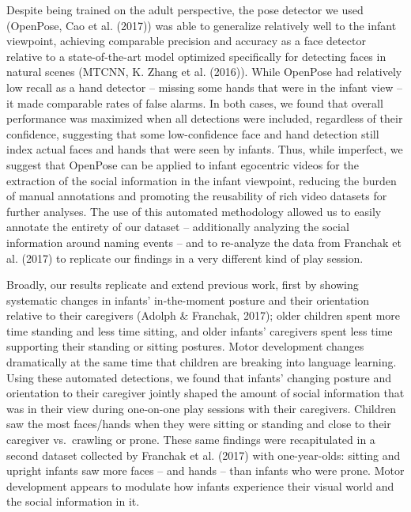 \documentclass[english,man]{apa6}
\begin{document}
Despite being trained on the adult perspective, the pose detector we
used (OpenPose, Cao et al. (2017)) was able to generalize relatively
well to the infant viewpoint, achieving comparable precision and
accuracy as a face detector relative to a state-of-the-art model
optimized specifically for detecting faces in natural scenes (MTCNN, K.
Zhang et al. (2016)). While OpenPose had relatively low recall as a hand
detector -- missing some hands that were in the infant view -- it made
comparable rates of false alarms. In both cases, we found that overall
performance was maximized when all detections were included, regardless
of their confidence, suggesting that some low-confidence face and hand
detection still index actual faces and hands that were seen by infants.
Thus, while imperfect, we suggest that OpenPose can be applied to infant
egocentric videos for the extraction of the social information in the
infant viewpoint, reducing the burden of manual annotations and
promoting the reusability of rich video datasets for further analyses.
The use of this automated methodology allowed us to easily annotate the
entirety of our dataset -- additionally analyzing the social information
around naming events -- and to re-analyze the data from Franchak et al.
(2017) to replicate our findings in a very different kind of play
session.

Broadly, our results replicate and extend previous work, first by
showing systematic changes in infants' in-the-moment posture and their
orientation relative to their caregivers (Adolph \& Franchak, 2017);
older children spent more time standing and less time sitting, and older
infants' caregivers spent less time supporting their standing or sitting
postures. Motor development changes dramatically at the same time that
children are breaking into language learning. Using these automated
detections, we found that infants' changing posture and orientation to
their caregiver jointly shaped the amount of social information that was
in their view during one-on-one play sessions with their caregivers.
Children saw the most faces/hands when they were sitting or standing and
close to their caregiver vs.~crawling or prone. These same findings were
recapitulated in a second dataset collected by Franchak et al. (2017)
with one-year-olds: sitting and upright infants saw more faces -- and
hands -- than infants who were prone. Motor development appears to
modulate how infants experience their visual world and the social
information in it.
\end{document}
